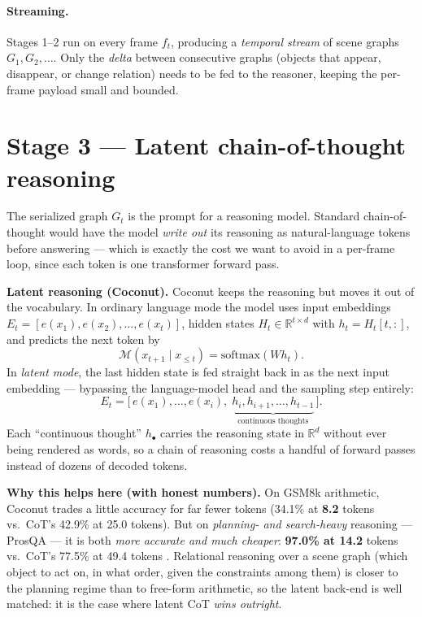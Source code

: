 \documentclass[10pt,letterpaper]{article}
\begin{document}
\paragraph{Streaming.} Stages 1--2 run on every frame $f_t$, producing a \emph{temporal stream} of
scene graphs $G_1, G_2, \dots$. Only the \emph{delta} between consecutive graphs (objects that
appear, disappear, or change relation) needs to be fed to the reasoner, keeping the per-frame
payload small and bounded.

\section{Stage 3 --- Latent chain-of-thought reasoning}

The serialized graph $G_t$ is the prompt for a reasoning model. Standard chain-of-thought would
have the model \emph{write out} its reasoning as natural-language tokens before answering --- which
is exactly the cost we want to avoid in a per-frame loop, since each token is one transformer
forward pass.

\textbf{Latent reasoning (Coconut).} Coconut \cite{hao2024} keeps the reasoning but moves it out of
the vocabulary. In ordinary language mode the model uses input embeddings
$E_t = [e(x_1), e(x_2), \dots, e(x_t)]$, hidden states $H_t\in\mathbb{R}^{t\times d}$ with
$h_t = H_t[t,:]$, and predicts the next token by
\begin{equation}
\mathcal{M}(x_{t+1}\mid x_{\le t}) = \mathrm{softmax}(W h_t).
\end{equation}
In \emph{latent mode}, the last hidden state is fed straight back in as the next input embedding ---
bypassing the language-model head and the sampling step entirely:
\begin{equation}
E_t = \big[\,e(x_1),\dots,e(x_i),\; \underbrace{h_i, h_{i+1}, \dots, h_{t-1}}_{\text{continuous thoughts}}\,\big].
\end{equation}
Each ``continuous thought'' $h_{\bullet}$ carries the reasoning state in $\mathbb{R}^d$ without ever
being rendered as words, so a chain of reasoning costs a handful of forward passes instead of dozens
of decoded tokens.

\textbf{Why this helps here (with honest numbers).} On GSM8k arithmetic, Coconut trades a little
accuracy for far fewer tokens (34.1\% at \textbf{8.2} tokens vs.\ CoT's 42.9\% at 25.0 tokens). But
on \emph{planning- and search-heavy} reasoning --- ProsQA --- it is both \emph{more accurate and
much cheaper}: \textbf{97.0\% at 14.2} tokens vs.\ CoT's 77.5\% at 49.4 tokens \cite{hao2024}.
Relational reasoning over a scene graph (which object to act on, in what order, given the
constraints among them) is closer to the planning regime than to free-form arithmetic, so the
latent back-end is well matched: it is the case where latent CoT \emph{wins outright}.
\end{document}
